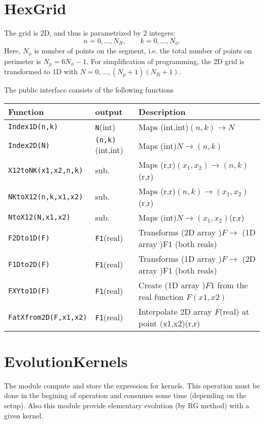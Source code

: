 \documentclass[prd,nofootinbib,eqsecnum,final]{revtex4}
\renewcommand{\(}{\left(}
\renewcommand{\)}{\right)}
\renewcommand{\[}{\left[}
\renewcommand{\]}{\right]}
\begin{document}
\section{HexGrid}

The grid is 2D, and thus is parametrized by 2 integers:
$$n=0,...,N_R, \qquad k=0,...,N_\phi .$$
Here, $N_\phi$ is number of points on the segment, i.e. the total number of points on perimeter is $N_p=6N_\phi-1$. For simplification of programming, the 2D grid is transformed to 1D with $N=0,...,(N_p+1)(N_R+1)$.

The public interface consists of the following functions
\begin{longtable}{||p{5cm}|p{2cm}|p{9cm}||}
Function & output & Description
\\
\hline\hline
\texttt{Index1D(n,k)} & \texttt{N}(int) & Maps (int,int)$(n,k)\to N$
\\\hline
\texttt{Index2D(N)} & \texttt{(n,k)}(int,int) & Maps (int)$N\to (n,k)$
\\\hline
\texttt{X12toNK(x1,x2,n,k)} & sub. & Maps (r,r)$(x_1,x_2)\to (n,k)$(r,r)
\\\hline
\texttt{NKtoX12(n,k,x1,x2)} & sub. & Maps (r,r)$(n,k)\to (x_1,x_2)$(r,r)
\\\hline
\texttt{NtoX12(N,x1,x2)} & sub. & Maps (int)$N\to (x_1,x_2)$(r,r)
\\\hline
\texttt{F2Dto1D(F)} & \texttt{F1}(real) & Transforms (2D array )$F \to$ (1D array )F1 (both reals)
\\\hline
\texttt{F1Dto2D(F)} & \texttt{F1}(real) & Transforms (1D array )$F \to$ (2D array )F1 (both reals)
\\\hline
\texttt{FXYto1D(F)} & \texttt{F1}(real) & Create (1D array )$F1$ from the real function $F(x1,x2)$
\\\hline
\texttt{FatXfrom2D(F,x1,x2)} & \texttt{F1}(real) & Interpolate 2D array $F$(real) at point (x1,x2)(r,r)
\end{longtable}

\section{EvolutionKernels}

The module compute and store the expression for kernels. This operation must be done in the begining of operation and consumes some time (depending on the setup). Also this module provide elementary evolution (by RG method) with a given kernel.
\end{document}
